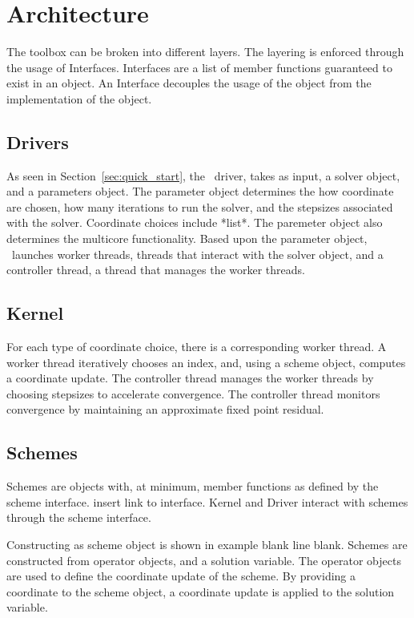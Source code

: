 \section{Architecture}

The toolbox can be broken into different layers. 
The layering is enforced through the usage of Interfaces.
Interfaces are a list of member functions guaranteed to exist in an object.
An Interface decouples the usage of the object from the implementation of the object. 

\subsection{Drivers}

As seen in Section~\ref{sec:quick_start}, the \pkg~driver, takes as input, a solver object, and a parameters object.
The parameter object determines the how coordinate are chosen, how many iterations to run the solver, and the stepsizes associated with the solver.
Coordinate choices include *list*.
The paremeter object also determines the multicore functionality. 
Based upon the parameter object, \pkg~launches worker threads, threads that interact with the solver object, and a controller thread, a thread that manages the worker threads.
  

\subsection{Kernel}

For each type of coordinate choice, there is a corresponding worker thread.
A worker thread iteratively chooses an index, and, using a scheme object, computes a coordinate update.
The controller thread manages the worker threads by choosing stepsizes to accelerate convergence.
The controller thread monitors convergence by maintaining an approximate fixed point residual.

\subsection{Schemes}
Schemes are objects with, at minimum, member functions as defined by the scheme interface.
insert link to interface.
Kernel and Driver interact with schemes through the scheme interface.

Constructing as scheme object is shown in example blank line blank.
Schemes are constructed from operator objects, and a solution variable.
The operator objects are used to define the coordinate update of the scheme.
By providing a coordinate to the scheme object, a coordinate update is applied to the solution variable.


